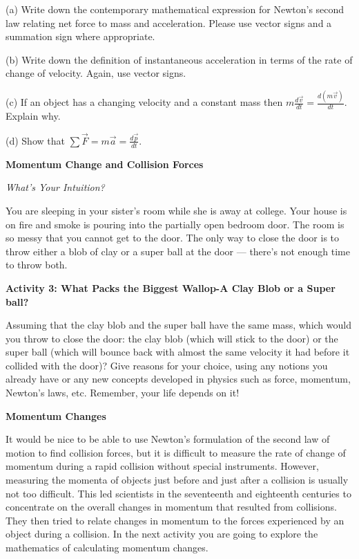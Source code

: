 (a) Write down the contemporary mathematical expression for Newton's second
law relating net force to mass and acceleration. Please use vector signs and
a summation sign where appropriate.
\vspace{10mm}

(b) Write down the definition of instantaneous acceleration in terms of the
rate of change of velocity. Again, use vector signs.
\vspace{10mm}

(c) If an object has a changing velocity and a constant
mass then \( m\frac{d{\vec v}}{dt}=\frac{d\left( m{\vec v}\right) }{dt} \).
Explain why.
\vspace{20mm}

(d) Show that \( \sum {\vec F}=m{\vec a}=\frac{d{\vec p}}{dt} \).
\vspace{20mm}


\textbf{Momentum Change and Collision Forces} 

\textit{What's Your Intuition?} 

You are sleeping in your sister's room while she is away at college. Your house
is on fire and smoke is pouring into the partially open bedroom door. The room
is so messy that you cannot get to the door. The only way to close the door
is to throw either a blob of clay or a super ball at the door --- 
there's not enough time to throw both.

\textbf{Activity 3: What Packs the Biggest Wallop-A Clay Blob or a Super ball? }

Assuming that the clay blob and the super ball have the same mass, which would
you throw to close the door: the clay blob (which will stick to the door) or
the super ball (which will bounce back with almost the same velocity it had
before it collided with the door)? Give reasons for your choice, using any notions
you already have or any new concepts developed in physics such as force, momentum,
Newton's laws, etc. Remember, your life depends on it!
\vspace{30mm}

\textbf{Momentum Changes} 

It would be nice to be able to use Newton's formulation of the second law of
motion to find collision forces, but it is difficult to measure the rate of
change of momentum during a rapid collision without special instruments. However,
measuring the momenta of objects just before and just after a collision is usually
not too difficult. This led scientists in the seventeenth and eighteenth centuries
to concentrate on the overall changes in momentum that resulted from collisions.
They then tried to relate changes in momentum to the forces experienced by an
object during a collision. In the next activity you are going to explore the
mathematics of calculating momentum changes.

